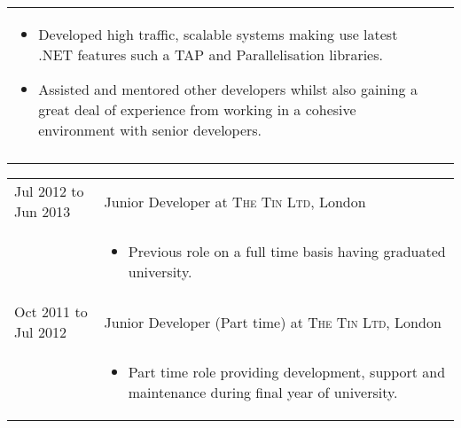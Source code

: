 \documentclass[a4paper,10pt]{article} %
\begin{document}
\begin{tabular}{ L{2cm} | L{11cm}}
\begin{itemize}[leftmargin=*]
		\item Developed high traffic, scalable systems making use latest .NET features such a TAP and Parallelisation libraries. 
		
		\item Assisted and mentored other developers whilst also gaining a great deal of experience from working in a cohesive environment with senior developers. 

	\end{itemize} \\
   
    
 \\

\end{tabular}
\clearpage
\begin{tabular}{ L{2cm} | L{11cm}}	



Jul 2012 to Jun 2013 \newline & Junior Developer at \textsc{The Tin Ltd}, London \\


 &\MPtrue	   
\begin{itemize}[leftmargin=*]

\item Previous role on a full time basis having graduated university. 

\end{itemize} \\
 



Oct 2011 to Jul 2012\newline & Junior Developer (Part time)  at \textsc{The Tin Ltd}, London \\

&\MPtrue	   
\begin{itemize}[leftmargin=*]

\item Part time role providing development, support and maintenance during final year of university.


\end{itemize}
\end{tabular}
\end{document}
